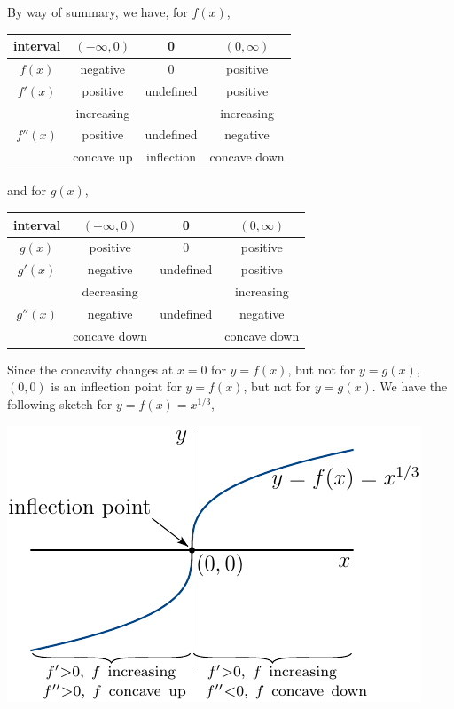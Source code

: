 \begin{eg}[Optional ---  $y=x^{1/3}$ and $y = x^{2/3}$]
\begin{enumerate}[(1)]
\end{enumerate}
By way of summary, we have, for $f(x)$,
\begin{center}
\begin{tabular}{|c||c||c||c||}
\hline
interval & $(-\infty,0)$ & 0 & $(0,\infty)$\\
\hline
$f(x)$ & negative & 0 & positive  \\
\hline
$f'(x)$ & positive & undefined & positive  \\
\hline
   & increasing &  & increasing \\
\hline
$f''(x)$ & positive & undefined & negative  \\
\hline
 & concave up & inflection & concave down 
\\
\hline
\end{tabular}
\end{center}
and for $g(x)$,
\begin{center}
\begin{tabular}{|c||c||c||c||}
\hline
interval & $(-\infty,0)$ & 0 & $(0,\infty)$\\
\hline
$g(x)$ & positive & 0 & positive  \\
\hline
$g'(x)$ & negative & undefined & positive  \\
\hline
       & decreasing &  & increasing \\
\hline
$g''(x)$ & negative & undefined & negative  \\
\hline
   & concave down &  & concave down 
\\
\hline
\end{tabular}
\end{center}
Since the concavity changes at $x=0$ for $y=f(x)$, but not for $y=g(x)$,
$(0,0)$ is an inflection point for $y=f(x)$, but not for $y=g(x)$.
We have the following sketch for $y=f(x)=x^{1/3}$,
\begin{efig}
 \begin{center}
  \includegraphics{sketch9} 

\end{center}
\end{efig}
\end{eg}
